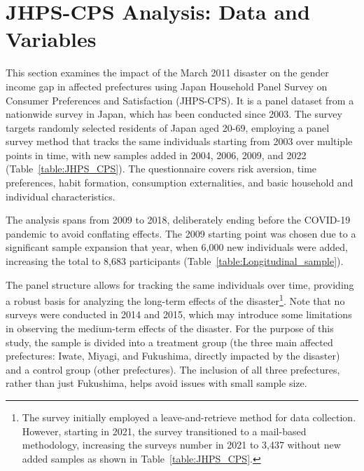 \documentclass[a4paper,12pt]{article}
\begin{document}
\section{JHPS-CPS Analysis: Data and Variables}

This section examines the impact of the March 2011 disaster on the gender income gap in affected prefectures using Japan Household Panel Survey on Consumer Preferences and Satisfaction (JHPS-CPS). It is a panel dataset from a nationwide survey in Japan, which has been conducted since 2003. The survey targets randomly selected residents of Japan aged 20-69, employing a panel survey method that tracks the same individuals starting from 2003 over multiple points in time, with new samples added in 2004, 2006, 2009, and 2022 (Table~\ref{table:JHPS_CPS}). The questionnaire covers risk aversion, time preferences, habit formation, consumption externalities, and basic household and individual characteristics. 




The analysis spans from 2009 to 2018, deliberately ending before the COVID-19 pandemic to avoid conflating effects. The 2009 starting point was chosen due to a significant sample expansion that year, when 6,000 new individuals were added, increasing the total to 8,683 participants (Table~\ref{table:Longitudinal_sample}).

The panel structure allows for tracking the same individuals over time, providing a robust basis for analyzing the long-term effects of the disaster\footnote{The survey initially employed a leave-and-retrieve method for data collection. However, starting in 2021, the survey transitioned to a mail-based methodology, increasing the surveys number in 2021 to 3,437 without new added samples as shown in Table~\ref{table:JHPS_CPS}.}. Note that no surveys were conducted in 2014 and 2015, which may introduce some limitations in observing the medium-term effects of the disaster. For the purpose of this study, the sample is divided into a treatment group (the three main affected prefectures: Iwate, Miyagi, and Fukushima, directly impacted by the disaster) and a control group (other prefectures). The inclusion of all three prefectures, rather than just Fukushima, helps avoid issues with small sample size.
\end{document}
